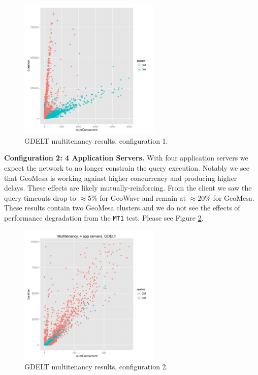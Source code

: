 \begin{figure}[h!tb]
  \centering
  \includegraphics[width=0.60\textwidth]{../docs/img/multitenancy/graph_uncut_mt1.png}
  \caption{GDELT multitenancy results, configuration 1.}
  \label{config1}
\end{figure}

{\bf Configuration 2: 4 Application Servers.}
With four application servers we expect the network to no longer constrain the query execution.
Notably we see that GeoMesa is working against higher concurrency and producing higher delays.
These effects are likely mutually-reinforcing.
From the client we saw the query timeouts drop to $ \approx 5$\% for GeoWave and remain at $\approx 20$\% for GeoMesa.
These results contain two GeoMesa clusters and we do not see the effects of performance degradation from the \texttt{MT1} test.
Please see Figure \ref{config2}.

\begin{figure}[h!tb]
  \centering
  \includegraphics[width=0.60\textwidth]{../docs/img/multitenancy/graph_100k_mt2.png}
  \caption{GDELT multitenancy results, configuration 2.}
  \label{config2}
\end{figure}

